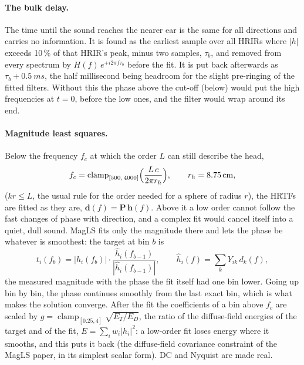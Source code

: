 \paragraph{The bulk delay.} The time until the sound reaches the nearer ear is the same for all directions and carries
no information. It is found as the earliest sample over all HRIRs where $|h|$ exceeds 10\,\% of that HRIR's peak,
minus two samples, $\tau_b$, and removed from every spectrum by $H(f)\,e^{+i2\pi f\tau_b}$ before the fit. It is put
back afterwards as $\tau_b + \SI{0.5}{ms}$, the half millisecond being headroom for the slight pre-ringing of the
fitted filters. Without this the phase above the cut-off (below) would put the high frequencies at $t=0$, before the
low ones, and the filter would wrap around its end.

\paragraph{Magnitude least squares.} Below the frequency $f_c$ at which the order $L$ can still describe the head,
\begin{equation}
  f_c = \operatorname{clamp}_{[500,\,4000]}\Bigl(\frac{L\,c}{2\pi r_h}\Bigr),\qquad r_h = \SI{8.75}{cm},
\end{equation}
($kr \le L$, the usual rule for the order needed for a sphere of radius $r$), the HRTFs are fitted as they are,
$\mathbf d(f) = \mathbf P\,\mathbf h(f)$. Above it a low order cannot follow the fast changes of phase with
direction, and a complex fit would cancel itself into a quiet, dull sound. MagLS fits only the magnitude there and lets
the phase be whatever is smoothest: the target at bin $b$ is
\begin{equation}
  t_i(f_b) = |h_i(f_b)|\cdot\frac{\hat h_i(f_{b-1})}{|\hat h_i(f_{b-1})|},\qquad
  \hat h_i(f) = \sum_k Y_{ik}\,d_k(f),
\end{equation}
the measured magnitude with the phase the fit itself had one bin lower. Going up bin by bin, the phase continues
smoothly from the last exact bin, which is what makes the solution converge. After the fit the coefficients of a bin
above $f_c$ are scaled by $g = \operatorname{clamp}_{[0.25,4]}\sqrt{E_T/E_D}$, the ratio of the diffuse-field energies
of the target and of the fit, $E = \sum_i w_i|h_i|^2$: a low-order fit loses energy where it smooths, and this puts it
back (the diffuse-field covariance constraint of the MagLS paper, in its simplest scalar form). DC and Nyquist are
made real.

